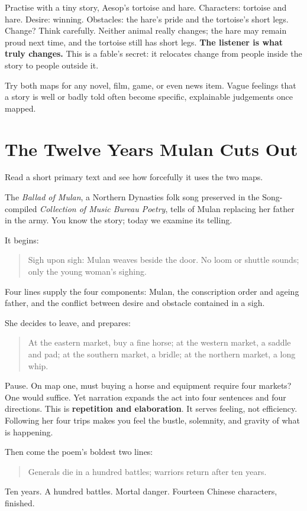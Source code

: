 Practise with a tiny story, Aesop's tortoise and hare. Characters: tortoise and hare. Desire: winning. Obstacles: the hare's pride and the tortoise's short legs. Change? Think carefully. Neither animal really changes; the hare may remain proud next time, and the tortoise still has short legs. \textbf{The listener is what truly changes.} This is a fable's secret: it relocates change from people inside the story to people outside it.

Try both maps for any novel, film, game, or even news item. Vague feelings that a story is well or badly told often become specific, explainable judgements once mapped.

\section{The Twelve Years Mulan Cuts Out}
Read a short primary text and see how forcefully it uses the two maps.

The \emph{Ballad of Mulan}, a Northern Dynasties folk song preserved in the Song-compiled \emph{Collection of Music Bureau Poetry}, tells of Mulan replacing her father in the army. You know the story; today we examine its telling.

It begins:

\begin{quote}
Sigh upon sigh: Mulan weaves beside the door. No loom or shuttle sounds; only the young woman's sighing.
\end{quote}
Four lines supply the four components: Mulan, the conscription order and ageing father, and the conflict between desire and obstacle contained in a sigh.

She decides to leave, and prepares:

\begin{quote}
At the eastern market, buy a fine horse; at the western market, a saddle and pad; at the southern market, a bridle; at the northern market, a long whip.
\end{quote}
Pause. On map one, must buying a horse and equipment require four markets? One would suffice. Yet narration expands the act into four sentences and four directions. This is \textbf{repetition and elaboration}. It serves feeling, not efficiency. Following her four trips makes you feel the bustle, solemnity, and gravity of what is happening.

Then come the poem's boldest two lines:

\begin{quote}
Generals die in a hundred battles; warriors return after ten years.
\end{quote}
Ten years. A hundred battles. Mortal danger. Fourteen Chinese characters, finished.

